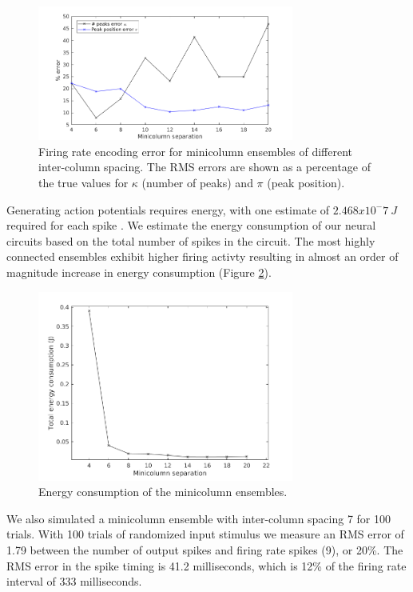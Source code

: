 \documentclass[a4paper,11pt]{article}
\begin{document}
\begin{figure}[!ht]
 \caption{Firing rate encoding error for minicolumn ensembles of different inter-column spacing. The RMS errors are shown as a percentage of the true values for $\kappa$ (number of peaks) and $\pi$ (peak position).}
 \label{fig:encoding_results}
 \centering
   \includegraphics[width=0.75\textwidth]{fig/EncodingError_3Trials}
\end{figure}

Generating action potentials requires energy, with one estimate of $2.468x10^-7\ J$ required for each spike \cite{zhu2018}.
We estimate the energy consumption of our neural circuits based on the total number of spikes in the circuit.
The most highly connected ensembles exhibit higher firing activty resulting in almost an order of magnitude increase in energy consumption (Figure \ref{fig:energy_consumption}).
\begin{figure}[!ht]
 \caption{Energy consumption of the minicolumn ensembles.}
 \label{fig:energy_consumption}
 \centering
   \includegraphics[width=0.75\textwidth]{fig/EnergyConsumption}
\end{figure}

We also simulated a minicolumn ensemble with inter-column spacing 7 for 100 trials.
With 100 trials of randomized input stimulus we measure an RMS error of 1.79 between the number of output spikes and firing rate spikes (9), or 20\%.
The RMS error in the spike timing is 41.2 milliseconds, which is 12\% of the firing rate interval of 333 milliseconds.
\end{document}
